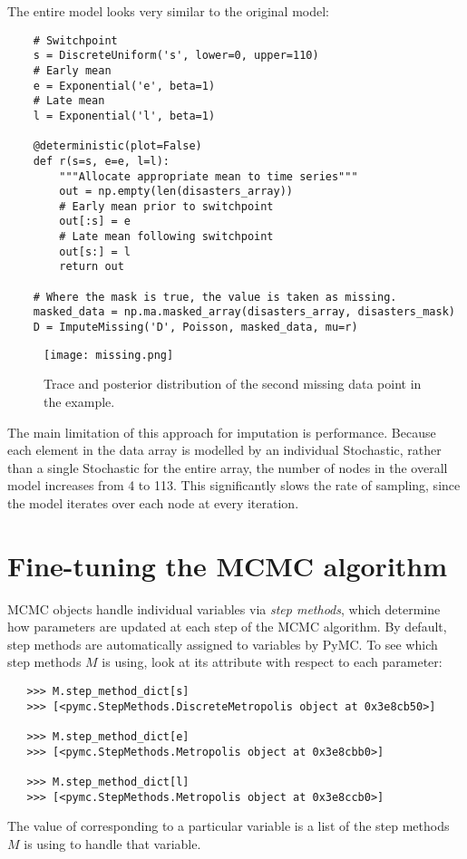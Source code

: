 The entire model looks very similar to the original model:

\begin{verbatim}
	# Switchpoint
	s = DiscreteUniform('s', lower=0, upper=110)
	# Early mean
	e = Exponential('e', beta=1)
	# Late mean
	l = Exponential('l', beta=1)

	@deterministic(plot=False)
	def r(s=s, e=e, l=l):
	    """Allocate appropriate mean to time series"""
	    out = np.empty(len(disasters_array))
	    # Early mean prior to switchpoint
	    out[:s] = e
	    # Late mean following switchpoint
	    out[s:] = l
	    return out

	# Where the mask is true, the value is taken as missing.
	masked_data = np.ma.masked_array(disasters_array, disasters_mask)
	D = ImputeMissing('D', Poisson, masked_data, mu=r)
\end{verbatim}

\begin{figure}[ht]
\begin{center}
\texttt{[image: missing.png]}
\caption{Trace and posterior distribution of the second missing data point in the example.}
\label{fig:missing}
\end{center}
\end{figure}

The main limitation of this approach for imputation is performance. Because each element in the data array is modelled by an individual Stochastic, rather than a single Stochastic for the entire array, the number of nodes in the overall model increases from 4 to 113. This significantly slows the rate of sampling, since the model iterates over each node at every iteration.



\section{Fine-tuning the MCMC algorithm}

MCMC objects handle individual variables via \emph{step methods}, which determine how parameters are updated at each step of the MCMC algorithm. By default, step methods are automatically assigned to variables by PyMC. To see which step methods $M$ is using, look at its  attribute with respect to each parameter:
\begin{verbatim}
   >>> M.step_method_dict[s]
   >>> [<pymc.StepMethods.DiscreteMetropolis object at 0x3e8cb50>]

   >>> M.step_method_dict[e]
   >>> [<pymc.StepMethods.Metropolis object at 0x3e8cbb0>]

   >>> M.step_method_dict[l]
   >>> [<pymc.StepMethods.Metropolis object at 0x3e8ccb0>]
\end{verbatim}
The value of  corresponding to a particular variable is a list of the step methods $M$ is using to handle that variable.

